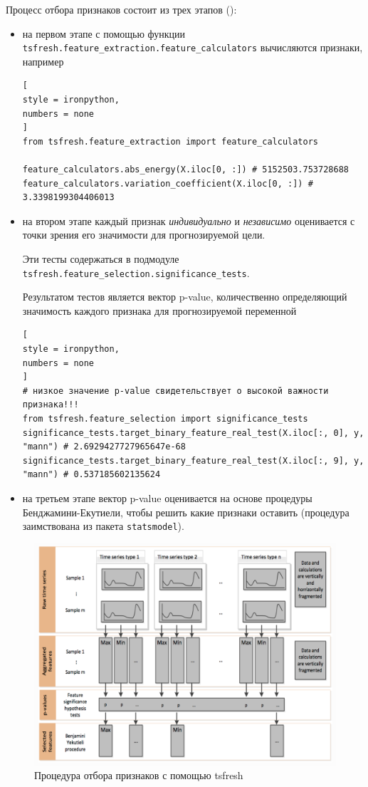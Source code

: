 \documentclass[%
	11pt,
	a4paper,
	utf8,
		]{article}
\begin{document}
Процесс отбора признаков состоит из  трех этапов ():
\begin{itemize}
	\item на первом этапе с помощью функции \texttt{tsfresh.feature\_extraction.feature\_calculators} вычисляются признаки, например
\begin{lstlisting}[
style = ironpython,
numbers = none	
]
from tsfresh.feature_extraction import feature_calculators

feature_calculators.abs_energy(X.iloc[0, :]) # 5152503.753728688
feature_calculators.variation_coefficient(X.iloc[0, :]) # 3.3398199304406013
\end{lstlisting}
	
	\item на втором этапе каждый признак \emph{индивидуально} и \emph{независимо} оценивается с точки зрения его значимости для прогнозируемой цели.
	
	Эти тесты содержаться в подмодуле \texttt{tsfresh.feature\_selection.significance\_tests}.
	
	Результатом тестов является вектор p-value, количественно определяющий значимость каждого признака для прогнозируемой переменной
\begin{lstlisting}[
style = ironpython,
numbers = none
]
# низкое значение p-value свидетельствует о высокой важности признака!!!
from tsfresh.feature_selection import significance_tests
significance_tests.target_binary_feature_real_test(X.iloc[:, 0], y, "mann") # 2.6929427727965647e-68
significance_tests.target_binary_feature_real_test(X.iloc[:, 9], y, "mann") # 0.537185602135624
\end{lstlisting}

    \item на третьем этапе вектор p-value оценивается на основе процедуры Бенджамини-Екутиели, чтобы решить какие признаки оставить (процедура заимствована из пакета \texttt{statsmodel}).
\end{itemize}

\begin{figure}[h]
	\centering
	\includegraphics[scale=0.35]{figures/tsfresh_feature_filter.png}
	\caption{ Процедура отбора признаков с помощью tsfresh }\label{fig:tsfresh_feature_filter}
\end{figure}
\end{document}

